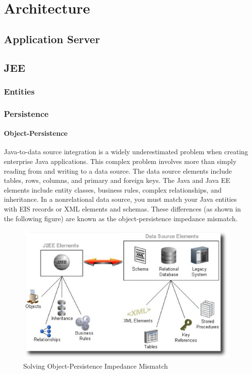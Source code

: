 \chapter{Architecture}
\section{Application Server}

\section{JEE}
\subsection{Entities}
\subsection{Persistence}
\subsubsection{Object-Persistence}
Java-to-data source integration is a widely underestimated problem when creating enterprise Java applications. This complex problem involves more than simply reading from and writing to a data source. The data source elements include tables, rows, columns, and primary and foreign keys. The Java and Java EE elements include entity classes, business rules, complex relationships, and inheritance. In a nonrelational data source, you must match your Java entities with EIS records or XML elements and schemas. These differences (as shown in the following figure) are known as the object-persistence impedance mismatch.

\begin{figure}
  \begin{center}
  \includegraphics[scale=0.6]{Figures/Object_Persistency_Mismatch.eps}
  \end{center}
  \caption{Solving Object-Persistence Impedance Mismatch}
  \label{Solving Object-Persistence Impedance Mismatch}
\end{figure}

